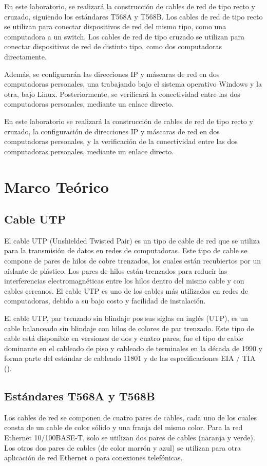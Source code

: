    En este laboratorio, se realizará la construcción de cables de red de tipo recto y cruzado, siguiendo los estándares T568A y T568B. Los cables de red de tipo recto se utilizan para conectar dispositivos de red del mismo tipo, como una computadora a un switch. Los cables de red de tipo cruzado se utilizan para conectar dispositivos de red de distinto tipo, como dos computadoras directamente.

    Además, se configurarán las direcciones IP y máscaras de red en dos computadoras personales, una trabajando bajo el sistema operativo Windows y la otra, bajo Linux. Posteriormente, se verificará la conectividad entre las dos computadoras personales, mediante un enlace directo.

    En este laboratorio se realizará la construcción de cables de red de tipo recto y cruzado, la configuración de direcciones IP y máscaras de red en dos computadoras personales, y la verificación de la conectividad entre las dos computadoras personales, mediante un enlace directo.

\section{Marco Teórico}
    \subsection{Cable UTP}

    El cable UTP (Unshielded Twisted Pair) es un tipo de cable de red que se utiliza para la transmisión de datos en redes de computadoras. Este tipo de cable se compone de pares de hilos de cobre trenzados, los cuales están recubiertos por un aislante de plástico. Los pares de hilos están trenzados para reducir las interferencias electromagnéticas entre los hilos dentro del mismo cable y con cables cercanos. El cable UTP es uno de los cables más utilizados en redes de computadoras, debido a su bajo costo y facilidad de instalación.

    El cable UTP, par trenzado sin blindaje pos sus siglas en inglés (UTP), es un cable balanceado sin blindaje con hilos de colores de par trenzado. Este tipo de cable está disponible en versiones de dos y cuatro pares, fue el tipo de cable dominante en el cableado de piso y cableado de terminales en la década de 1990 y forma parte del estándar de cableado 11801 y de las especificaciones EIA / TIA (\cite{Castro_2023}).

    \subsection{Estándares T568A y T568B}
    Los cables de red se componen de cuatro pares de cables, cada uno de los cuales consta de un cable de color sólido y una franja del mismo color. Para la red Ethernet 10/100BASE-T, solo se utilizan dos pares de cables (naranja y verde). Los otros dos pares de cables (de color marrón y azul) se utilizan para otra aplicación de red Ethernet o para conexiones telefónicas.

